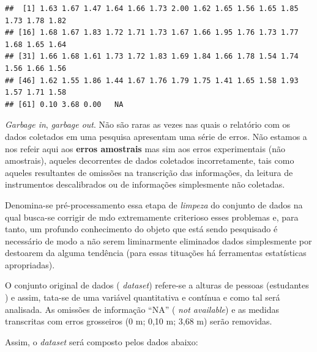 \documentclass[
]{book}
\begin{document}
\begin{verbatim}
##  [1] 1.63 1.67 1.47 1.64 1.66 1.73 2.00 1.62 1.65 1.56 1.65 1.85 1.73 1.78 1.82
## [16] 1.68 1.67 1.83 1.72 1.71 1.73 1.67 1.66 1.95 1.76 1.73 1.77 1.68 1.65 1.64
## [31] 1.66 1.68 1.61 1.73 1.72 1.83 1.69 1.84 1.66 1.78 1.54 1.74 1.56 1.66 1.56
## [46] 1.62 1.55 1.86 1.44 1.67 1.76 1.79 1.75 1.41 1.65 1.58 1.93 1.57 1.71 1.58
## [61] 0.10 3.68 0.00   NA
\end{verbatim}

\hfill\break
\emph{Garbage in}, \emph{garbage out}. Não são raras as vezes nas quais o relatório com os dados coletados em uma pesquisa apresentam uma série de erros. Não estamos a nos refeir aqui aos \textbf{erros amostrais} mas sim aos erros experimentais (não amostrais), aqueles decorrentes de dados coletados incorretamente, tais como aqueles resultantes de omissões na transcrição das informações, da leitura de instrumentos descalibrados ou de informações simplesmente não coletadas.

\hfill\break

Denomina-se pré-processamento essa etapa de \emph{limpeza} do conjunto de dados na qual busca-se corrigir de mdo extremamente criterioso esses problemas e, para tanto, um profundo conhecimento do objeto que está sendo pesquisado é necessário de modo a não serem liminarmente eliminados dados simplesmente por destoarem da alguma tendência (para essas tituações há ferramentas estatísticas apropriadas).\\

\hfill\break

O conjunto original de dados ( \emph{dataset}) refere-se a alturas de pessoas (estudantes ) e assim, tata-se de uma variável quantitativa e contínua e como tal será analisada. As omissões de informação ``NA'' ( \emph{not available}) e as medidas transcritas com erros grosseiros (0 m; 0,10 m; 3,68 m) serão removidas.

\hfill\break

Assim, o \emph{dataset} será composto pelos dados abaixo:

\hfill\break
\end{document}
